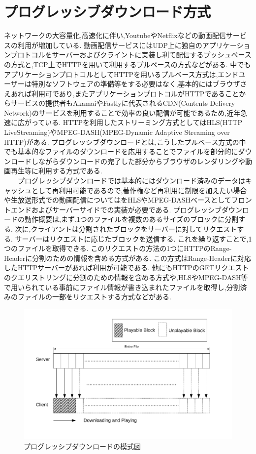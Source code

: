 \documentclass[a4j,12pt]{gradthesis_utf8}
\begin{document}
\section{プログレッシブダウンロード方式}
ネットワークの大容量化,高速化に伴い,Youtube\cite{youtube}やNetflix\cite{netflix}などの動画配信サービスの利用が増加している.
動画配信サービスにはUDP上に独自のアプリケーションプロトコルをサーバーおよびクライントに実装し利て配信するプッシュベースの方式と,TCP上でHTTPを用いて利用するプルベースの方式などがある.
中でもアプリケーションプロトコルとしてHTTPを用いるプルベース方式は,エンドユーザーは特別なソフトウェアの準備等をする必要はなく,基本的にはブラウザさえあれば利用可であり,またアプリケーションプロトコルがHTTPであることからサービスの提供者もAkamaiやFastlyに代表されるCDN(Contents Delivery Network)のサービスを利用することで効率の良い配信が可能であるため,近年急速に広がっている.
HTTPを利用したストリーミング方式としてはHLS(HTTP LiveStreaming)\cite{hls}やMPEG-DASH(MPEG-Dynamic Adaptive Streaming over HTTP)\cite{dash}がある.
プログレッシブダウンロードとは,こうしたプルベース方式の中でも基本的なファイルのダウンロードを応用することでファイルを部分的にダウンロードしながらダウンロードの完了した部分からブラウザのレンダリングや動画再生等に利用する方式である.\\
\ \ \ \ プログレッシブダウンロードでは基本的にはダウンロード済みのデータはキャッシュとして再利用可能であるので,著作権など再利用に制限を加えたい場合や生放送形式での動画配信についてはをHLSやMPEG-DASHベースとしてフロントエンドおよびサーバーサイドでの実装が必要である.
プログレッシブダウンロードの動作概要は,まず,1つのファイルを複数のあるサイズのブロックに分割する.
次に,クライアントは分割されたブロックをサーバーに対してリクエストする.
サーバーはリクエストに応じたブロックを送信する.
これを繰り返すことで,1つのファイルを取得できる.
このリクエストの方法の1つにHTTPのRange-Headerに分割のための情報を含める方式がある.
この方式はRange-Headerに対応したHTTPサーバーがあれば利用が可能である.
他にもHTTPのGETリクエストのクエリストリングに分割のための情報を含める方式や,HLSやMPEG-DASH等で用いられている事前にファイル情報が書き込まれたファイルを取得し,分割済みのファイルの一部をリクエストする方式などがある.

\begin{figure}[h]
	\centering
	\includegraphics[width=16cm]{figure/p-dl.pdf}
	\caption{プログレッシブダウンロードの模式図}
	\label{p-dl}
\end{figure}
\end{document}
